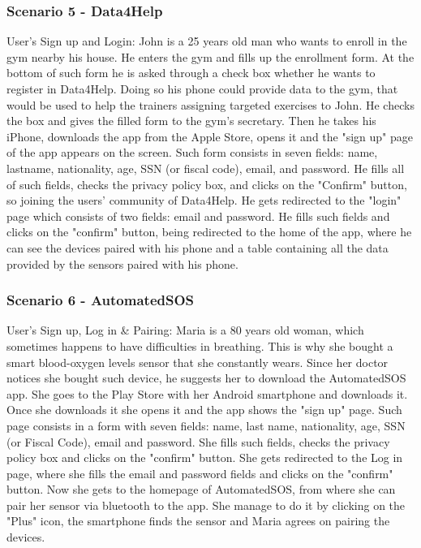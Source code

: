 {\color{secblue}\subsubsection{Scenario 5 - Data4Help}}
User's Sign up and Login:
John is a 25 years old man who wants to enroll in the gym nearby his house.
He enters the gym and fills up the enrollment form.
At the bottom of such form he is asked through a check box whether he wants to register in Data4Help. Doing so his phone could provide data to the gym, that would be used to help the trainers assigning targeted exercises to John.
He checks the box and gives the filled form to the gym's secretary. 
Then he takes his iPhone, downloads the app from the Apple Store, opens it and the "sign up" page of the app appears on the screen.
Such form consists in seven fields: name, lastname, nationality, age, SSN (or fiscal code), email, and password.
He fills all of such fields, checks the privacy policy box,  and clicks on the "Confirm" button, so joining the users' community of Data4Help.
He gets redirected to the "login" page which consists of two fields: email and password.
He fills such fields and clicks on the "confirm" button, being redirected to the home of the app, where he can see the devices paired with his phone and a table containing all the data provided by the sensors paired with his phone.

{\color{secblue}\subsubsection{Scenario 6 - AutomatedSOS}}
User's Sign up, Log in \& Pairing:
Maria is a 80 years old woman, which sometimes happens to have difficulties in breathing. 
This is why she bought a smart blood-oxygen levels sensor that she constantly wears.
Since her doctor notices she bought such device, he suggests her to download the AutomatedSOS app.
She goes to the Play Store with her Android smartphone and downloads it. 
Once she downloads it she opens it and the app shows the "sign up" page. Such page consists in a form with seven fields:
name, last name, nationality, age, SSN (or Fiscal Code), email and password.
She fills such fields, checks the privacy policy box and clicks on the "confirm" button.
She gets redirected  to the Log in page, where she fills the email and password fields and clicks on the "confirm" button.
Now she gets to the homepage of AutomatedSOS, from where she can pair her sensor via bluetooth to the app. 
She manage to do it by clicking on the "Plus" icon, the smartphone finds the sensor and Maria agrees on pairing the devices.

